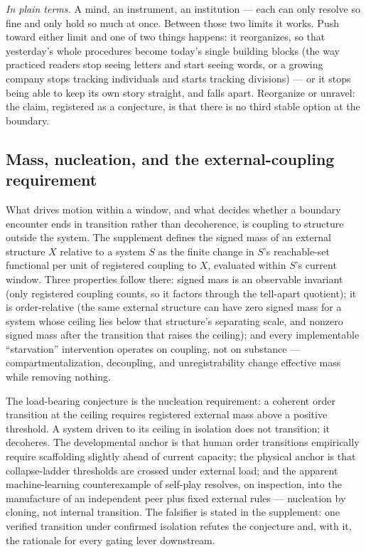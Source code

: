 \documentclass[11pt]{article}
\theoremstyle{definition}
\newcommand{\plainterms}{\emph{In plain terms.}}
\begin{document}
\noindent\plainterms{} A mind, an instrument, an institution --- each can only resolve so fine and only hold so much at once. Between those two limits it works. Push toward either limit and one of two things happens: it reorganizes, so that yesterday's whole procedures become today's single building blocks (the way practiced readers stop seeing letters and start seeing words, or a growing company stops tracking individuals and starts tracking divisions) --- or it stops being able to keep its own story straight, and falls apart. Reorganize or unravel: the claim, registered as a conjecture, is that there is no third stable option at the boundary.

\subsection{Mass, nucleation, and the external-coupling requirement}

What drives motion within a window, and what decides whether a boundary encounter ends in transition rather than decoherence, is coupling to structure outside the system. The supplement defines the signed mass of an external structure $X$ relative to a system $S$ as the finite change in $S$'s reachable-set functional per unit of registered coupling to $X$, evaluated within $S$'s current window. Three properties follow there: signed mass is an observable invariant (only registered coupling counts, so it factors through the tell-apart quotient); it is order-relative (the same external structure can have zero signed mass for a system whose ceiling lies below that structure's separating scale, and nonzero signed mass after the transition that raises the ceiling); and every implementable ``starvation'' intervention operates on coupling, not on substance --- compartmentalization, decoupling, and unregistrability change effective mass while removing nothing.

The load-bearing conjecture is the nucleation requirement: a coherent order transition at the ceiling requires registered external mass above a positive threshold. A system driven to its ceiling in isolation does not transition; it decoheres. The developmental anchor is that human order transitions empirically require scaffolding slightly ahead of current capacity; the physical anchor is that collapse-ladder thresholds are crossed under external load; and the apparent machine-learning counterexample of self-play resolves, on inspection, into the manufacture of an independent peer plus fixed external rules --- nucleation by cloning, not internal transition. The falsifier is stated in the supplement: one verified transition under confirmed isolation refutes the conjecture and, with it, the rationale for every gating lever downstream.
\end{document}
